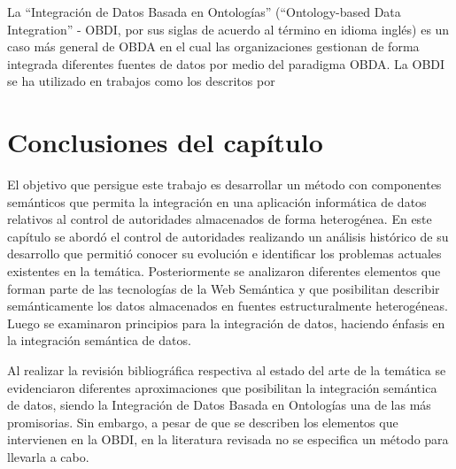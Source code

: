 La ``Integración de Datos Basada en Ontologías'' (``Ontology-based Data Integration'' - OBDI, por sus siglas de acuerdo al término en idioma inglés) es un caso más general de OBDA en el cual las organizaciones gestionan de forma integrada diferentes fuentes de datos por medio del paradigma OBDA. La OBDI se ha utilizado en trabajos como los descritos por \cite{Calvanese2016,Daraio2016,Kharlamov:2016:OIS:2882903.2899385}

\section{Conclusiones del capítulo}
El objetivo que persigue este trabajo es desarrollar un método con componentes semánticos que permita la integración en una aplicación informática de datos relativos al control de autoridades almacenados de forma heterogénea. En este capítulo se abordó el control de autoridades realizando un análisis histórico de su desarrollo que permitió conocer su evolución e identificar los problemas actuales existentes en la temática. Posteriormente se analizaron diferentes elementos que forman parte de las tecnologías de la Web Semántica y que posibilitan describir semánticamente los datos almacenados en fuentes estructuralmente heterogéneas. Luego se examinaron principios para la integración de datos, haciendo énfasis en la integración semántica de datos.

Al realizar la revisión bibliográfica respectiva al estado del arte de la temática se evidenciaron diferentes aproximaciones que posibilitan la integración semántica de datos, siendo la Integración de Datos Basada en Ontologías una de las más promisorias. Sin embargo, a pesar de que se describen los elementos que intervienen en la OBDI, en la literatura revisada no se especifica un método para llevarla a cabo.








